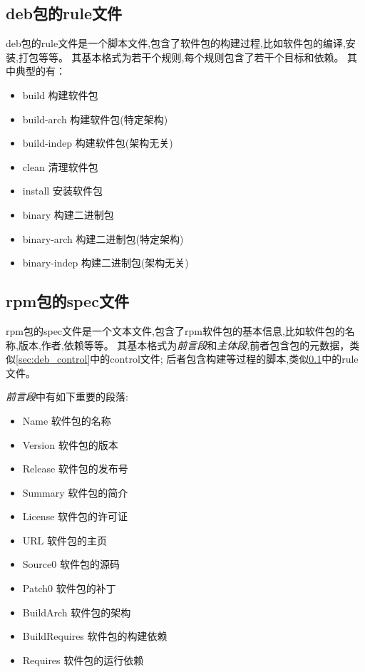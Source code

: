 \documentclass{article}
\begin{document}
\subsection{deb包的rule文件}
\label{sec:deb_rule}
deb包的rule文件是一个脚本文件,包含了软件包的构建过程,比如软件包的编译,安装,打包等等。
其基本格式为若干个规则,每个规则包含了若干个目标和依赖。
其中典型的有：
\begin{itemize}
    \item build 构建软件包
    \item build-arch 构建软件包(特定架构)
    \item build-indep 构建软件包(架构无关)
    \item clean 清理软件包
    \item install 安装软件包
    \item binary 构建二进制包
    \item binary-arch 构建二进制包(特定架构)
    \item binary-indep 构建二进制包(架构无关)
    
\end{itemize}

\subsection{rpm包的spec文件}
rpm包的spec文件是一个文本文件,包含了rpm软件包的基本信息,比如软件包的名称,版本,作者,依赖等等。
其基本格式为\emph{前言段}和\emph{主体段},前者包含包的元数据，类似\ref{sec:deb_control}中的control文件;
后者包含构建等过程的脚本,类似\ref{sec:deb_rule}中的rule文件。

\emph{前言段}中有如下重要的段落:
\begin{itemize}
    \item Name  软件包的名称
    \item Version  软件包的版本
    \item Release  软件包的发布号
    \item Summary  软件包的简介
    \item License  软件包的许可证
    \item URL  软件包的主页
    \item Source0  软件包的源码
    \item Patch0  软件包的补丁
    \item BuildArch  软件包的架构
    \item BuildRequires  软件包的构建依赖
    \item Requires  软件包的运行依赖
\end{itemize}
\end{document}
